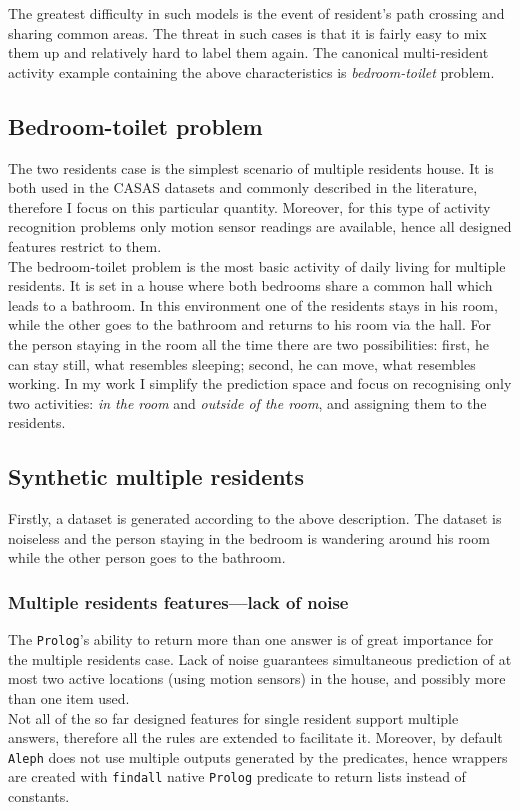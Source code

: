 \documentclass[10pt, a4paper, pdflatex, leqno, twoside, openright]{report}
\begin{document}
The greatest difficulty in such models is the event of resident's path crossing and sharing common areas. The threat in such cases is that it is fairly easy to mix them up and relatively hard to label them again. The canonical multi-resident activity example containing the above characteristics is \emph{bedroom-toilet} problem.

    \subsection{Bedroom-toilet problem}
The two residents case is the simplest scenario of multiple residents house. It is both used in the CASAS datasets and commonly described in the literature, therefore I focus on this particular quantity. Moreover, for this type of activity recognition problems only motion sensor readings are available, hence all designed features restrict to them.\\

The bedroom-toilet problem is the most basic activity of daily living for multiple residents. It is set in a house where both bedrooms share a common hall which leads to a bathroom. In this environment one of the residents stays in his room, while the other goes to the bathroom and returns to his room via the hall. For the person staying in the room all the time there are two possibilities: first, he can stay still, what resembles sleeping; second, he can move, what resembles working. In my work I simplify the prediction space and focus on recognising only two activities: \emph{in the room} and \emph{outside of the room}, and assigning them to the residents.

    \subsection{Synthetic multiple residents}
Firstly, a dataset is generated according to the above description. The dataset is noiseless and the person staying in the bedroom is wandering around his room while the other person goes to the bathroom.

      \subsubsection{Multiple residents features---lack of noise}
The \texttt{Prolog}'s ability to return more than one answer is of great importance for the multiple residents case. Lack of noise guarantees simultaneous prediction of at most two active locations (using motion sensors) in the house, and possibly more than one item used.\\
Not all of the so far designed features for single resident support multiple answers, therefore all the rules are extended to facilitate it. Moreover, by default \texttt{Aleph} does not use multiple outputs generated by the predicates, hence wrappers are created with \texttt{findall} native \texttt{Prolog} predicate to return lists instead of constants.\\
\end{document}
